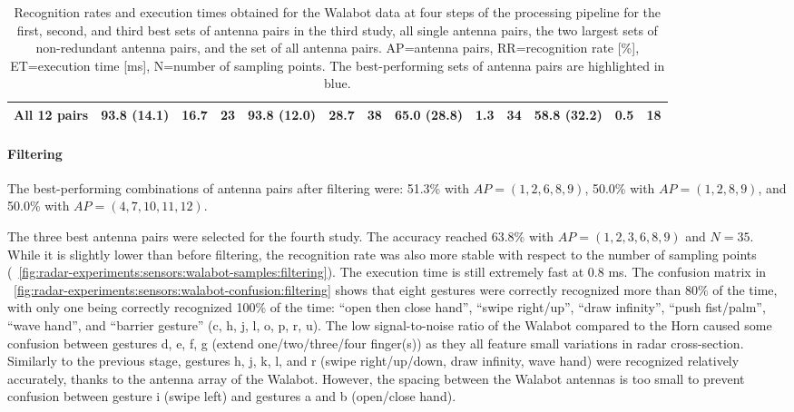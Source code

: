 \begin{table}[bt]
{\begin{tabular}{l|rrr|rrr|rrr|rrr}
        All 12 pairs & \cellcolor{graybluebrighter} 93.8 (14.1) & 16.7 & 23 &
        93.8 (12.0) & 28.7 & 38 &
        \cellcolor{graybluebrighter} 65.0 (28.8) & 1.3 & 34 &
        58.8 (32.2) & 0.5 & 18 \\
        \bottomrule
    \end{tabular}
    }
    \caption{Recognition rates and execution times obtained for the Walabot data at four steps of the processing pipeline for the first, second, and third best sets of antenna pairs in the third study, all single antenna pairs, the two largest sets of non-redundant antenna pairs, and the set of all antenna pairs. AP=antenna pairs, RR=recognition rate [\%], ET=execution time [ms], N=number of sampling points. The best-performing sets of antenna pairs are highlighted in blue.}
    \label{tab:radar-experiments:sensors:walabot}
\end{table}

\paragraph{Filtering}
The best-performing combinations of antenna pairs after filtering were: 51.3\% with $AP{=}(1, 2, 6, 8, 9)$, 50.0\% with $AP{=}(1, 2, 8, 9)$, and 50.0\% with $AP{=}(4, 7, 10, 11, 12)$.

The three best antenna pairs were selected for the fourth study. 
The accuracy reached 63.8\% with $AP{=}(1, 2, 3, 6, 8, 9)$ and $N{=}35$. While it is slightly lower than before filtering, the recognition rate was also more stable with respect to the number of sampling points (\fig~\ref{fig:radar-experiments:sensors:walabot-samples:filtering}).
The execution time is still extremely fast at 0.8 ms. 
%
The confusion matrix in \fig~\ref{fig:radar-experiments:sensors:walabot-confusion:filtering} shows that eight gestures were correctly recognized more than 80\% of the time, with only one being correctly recognized 100\% of the time: ``open then close hand'', ``swipe right/up'', ``draw infinity'', ``push fist/palm'', ``wave hand'', and ``barrier gesture'' (c, h, j, l, o, p, r, u).
%
The low signal-to-noise ratio of the Walabot compared to the Horn caused some confusion between gestures d, e, f, g (extend one/two/three/four finger(s)) as they all feature small variations in radar cross-section.
%
Similarly to the previous stage, gestures h, j, k, l, and r (swipe right/up/down, draw infinity, wave hand) were recognized relatively accurately, thanks to the antenna array of the Walabot.
%
However, the spacing between the Walabot antennas is too small to prevent confusion between gesture i (swipe left) and gestures a and b (open/close hand).

